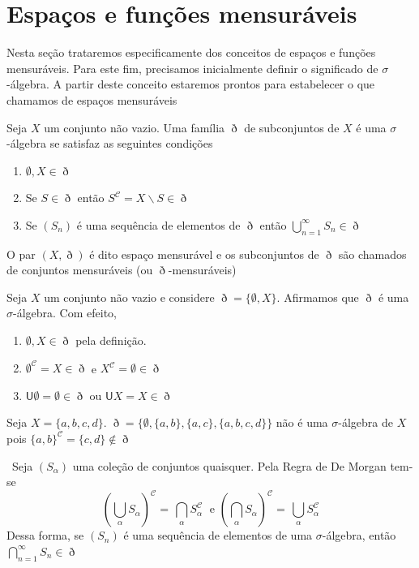 \documentclass[a4paper, 11pt]{book}
\theoremstyle{definition}
\newcommand{\obs}{\noindent{\textbf{\textcolor{black}{\sffamily Observação:}}}~}
\newcommand{\medcup}{\mathsf{U}}
\newcommand{\cC}{\mathcal{C}}
\begin{document}
\section{Espaços e funções mensuráveis}

Nesta seção trataremos especificamente dos conceitos de espaços e funções mensuráveis. Para este fim, precisamos inicialmente definir o significado de $\sigma$-álgebra. A partir deste conceito estaremos prontos para estabelecer o que chamamos de espaços mensuráveis

\begin{dbox}
    Seja $X$ um conjunto não vazio. Uma família $\eth$ de subconjuntos de $X$ é uma $\sigma$-álgebra se satisfaz as seguintes condições
    \begin{enumerate}[leftmargin=*]
        \item $\emptyset, X \in \eth$
        \item Se $S \in \eth$ então $S^{\mathcal{C}} = X \smallsetminus S \in \eth$
        \item Se $(S_n)$ é uma sequência de elementos de $\eth$ então $\bigcup \limits_{n=1}^{\infty} S_n \in \eth$
    \end{enumerate} 
    O par $(X, \eth)$ é dito espaço mensurável e os subconjuntos de $\eth$ são chamados de conjuntos mensuráveis (ou $\eth$-mensuráveis)
\end{dbox}

\begin{ex}
    Seja $X$ um conjunto não vazio e considere $\eth = \{\emptyset, X\}$. 
    Afirmamos que $\eth$ é uma $\sigma$-álgebra.
    Com efeito,
    \begin{enumerate}[leftmargin=*]
        \item $\emptyset, X \in \eth$ pela definição.
        \item $\emptyset^{\mathcal{C}} = X \in \eth$ e $X^{\mathcal{C}} = \emptyset \in \eth$
        \item $\medcup \emptyset = \emptyset \in \eth$ ou $\medcup X = X \in \eth$
    \end{enumerate}
\end{ex}

\begin{ex}
    Seja $X = \{a, b, c, d\}$. $\eth = \{\emptyset, \{a,b\}, \{a,c\}, \{a,b,c,d\}\}$ não é uma $\sigma$-álgebra de $X$ pois $\{a,b\}^{\mathcal{C}} = \{c,d\} \not\in \eth$
\end{ex}

\obs Seja $(S_\alpha)$ uma coleção de conjuntos quaisquer. Pela Regra de De Morgan tem-se
\[
    \left( \bigcup_{\alpha} S_\alpha \right)^\cC \!\! = \,\bigcap_\alpha S_\alpha^\cC \;\text{ e }  \left( \bigcap_{\alpha} S_\alpha \right)^\cC \!\! = \,\bigcup_\alpha S_\alpha^\cC
\]
Dessa forma, se $(S_n)$ é uma sequência de elementos de uma $\sigma$-álgebra, então $\bigcap_{n=1}^\infty S_n \in \eth$
\end{document}
